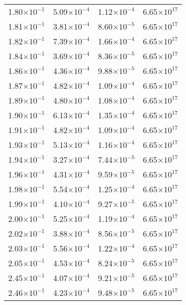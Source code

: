 \documentclass{aa}
\begin{document}
{\begin{longtable}{c|c|c|c}
1.80$\times 10^{-1}$ & 5.09$\times 10^{-4}$ & 1.12$\times 10^{-4}$ & 6.65$\times 10^{17}$  \\
1.81$\times 10^{-1}$ & 3.81$\times 10^{-4}$ & 8.60$\times 10^{-5}$ & 6.65$\times 10^{17}$  \\
1.82$\times 10^{-1}$ & 7.39$\times 10^{-4}$ & 1.66$\times 10^{-4}$ & 6.65$\times 10^{17}$  \\
1.84$\times 10^{-1}$ & 3.69$\times 10^{-4}$ & 8.36$\times 10^{-5}$ & 6.65$\times 10^{17}$  \\
1.86$\times 10^{-1}$ & 4.36$\times 10^{-4}$ & 9.88$\times 10^{-5}$ & 6.65$\times 10^{17}$  \\
1.87$\times 10^{-1}$ & 4.82$\times 10^{-4}$ & 1.09$\times 10^{-4}$ & 6.65$\times 10^{17}$  \\
1.89$\times 10^{-1}$ & 4.80$\times 10^{-4}$ & 1.08$\times 10^{-4}$ & 6.65$\times 10^{17}$  \\
1.90$\times 10^{-1}$ & 6.13$\times 10^{-4}$ & 1.35$\times 10^{-4}$ & 6.65$\times 10^{17}$  \\
1.91$\times 10^{-1}$ & 4.82$\times 10^{-4}$ & 1.09$\times 10^{-4}$ & 6.65$\times 10^{17}$  \\
1.93$\times 10^{-1}$ & 5.13$\times 10^{-4}$ & 1.16$\times 10^{-4}$ & 6.65$\times 10^{17}$  \\
1.94$\times 10^{-1}$ & 3.27$\times 10^{-4}$ & 7.44$\times 10^{-5}$ & 6.65$\times 10^{17}$  \\
1.96$\times 10^{-1}$ & 4.31$\times 10^{-4}$ & 9.59$\times 10^{-5}$ & 6.65$\times 10^{17}$  \\
1.98$\times 10^{-1}$ & 5.54$\times 10^{-4}$ & 1.25$\times 10^{-4}$ & 6.65$\times 10^{17}$  \\
1.99$\times 10^{-1}$ & 4.10$\times 10^{-4}$ & 9.27$\times 10^{-5}$ & 6.65$\times 10^{17}$  \\
2.00$\times 10^{-1}$ & 5.25$\times 10^{-4}$ & 1.19$\times 10^{-4}$ & 6.65$\times 10^{17}$  \\
2.02$\times 10^{-1}$ & 3.88$\times 10^{-4}$ & 8.56$\times 10^{-5}$ & 6.65$\times 10^{17}$  \\
2.03$\times 10^{-1}$ & 5.56$\times 10^{-4}$ & 1.22$\times 10^{-4}$ & 6.65$\times 10^{17}$  \\
2.05$\times 10^{-1}$ & 4.53$\times 10^{-4}$ & 8.24$\times 10^{-5}$ & 6.65$\times 10^{17}$  \\
2.45$\times 10^{-1}$ & 4.07$\times 10^{-4}$ & 9.21$\times 10^{-5}$ & 6.65$\times 10^{17}$  \\
2.46$\times 10^{-1}$ & 4.23$\times 10^{-4}$ & 9.48$\times 10^{-5}$ & 6.65$\times 10^{17}$  \\

\end{longtable}}
\end{document}
